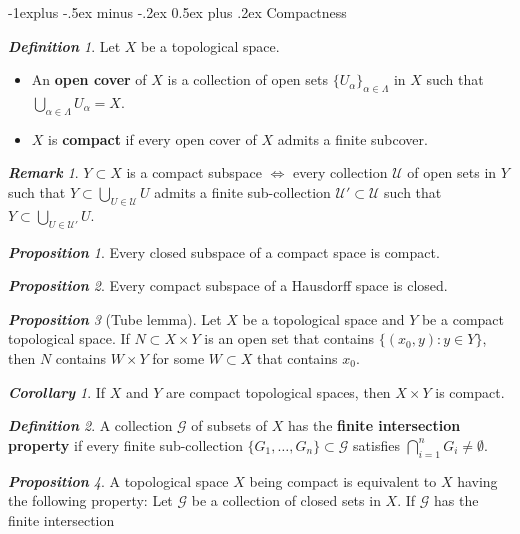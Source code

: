 \documentclass[frenchspacing,9pt,landscape,a4paper]{article}
\makeatletter
\renewcommand{\subsection}{\@startsection{subsection}{2}{0mm}%
                                {-1explus -.5ex minus -.2ex}%
                                {0.5ex plus .2ex}%
                                {\normalfont\normalsize\bfseries}}
\theoremstyle{remark}
\newtheorem*{defn}{\textbf{Definition}}
\newtheorem*{prop}{\textbf{Proposition}}
\newtheorem*{cor}{\textbf{Corollary}}
\newtheorem*{rem}{\textbf{Remark}}
\makeatother
\begin{document}
\begin{multicols}{4}
\subsection{Compactness}
\begin{defn}
    Let $X$ be a topological space.
     \begin{itemize}
         \item An \textbf{open cover} of $X$ is a collection of open sets  $\{U_\alpha\}_{\alpha\in\Lambda}$ in  $X$
             such that  $\bigcup_{\alpha\in\Lambda}U_\alpha=X$. 
         \item $X$ is \textbf{compact} if every open cover of  $X$ admits a finite subcover.
    \end{itemize}
\end{defn}
\begin{rem}
    $Y\subset X$ is a compact subspace  $\iff$ every collection  $\mathcal{U}$ of open sets in  $Y$ such
    that $Y\subset\bigcup_{U\in\mathcal{U}} U$ admits a finite sub-collection
    $\mathcal{U}'\subset\mathcal{U}$ such that  $Y\subset\bigcup_{U\in\mathcal{U}'}U$.
\end{rem}
\begin{prop}
    Every closed subspace of a compact space is compact.
\end{prop}
\begin{prop}
    Every compact subspace of a Hausdorff space is closed.
\end{prop}
\begin{prop}[Tube lemma]
    Let $X$ be a topological space and  $Y$ be a compact topological space. If  $N\subset X\times Y$ is an
    open set that contains  $\{(x_0,y):y\in Y\}$, then $N$ contains $W\times Y$ for some  $W\subset X$ that
    contains $x_0$.
\end{prop}
\begin{cor}
    If $X$ and  $Y$ are compact topological spaces, then  $X\times Y$ is compact.
\end{cor}
\begin{defn}
    A collection $\mathcal{G}$ of subsets of  $X$ has the \textbf{finite intersection property} if every
    finite sub-collection  $\{G_1,\dots,G_n\}\subset\mathcal{G}$ satisfies $\bigcap_{i=1}^n
    G_i\neq\emptyset$.   
\end{defn}
\begin{prop}
    A topological space $X$ being compact is equivalent to  $X$ having the following property: Let
    $\mathcal{G}$ be a collection of closed sets in  $X$. If  $\mathcal{G}$ has the finite intersection

\end{prop}
\end{multicols}
\end{document}
